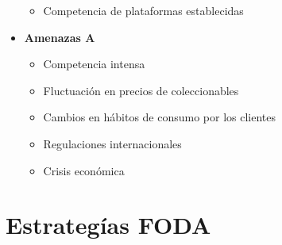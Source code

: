 \documentclass[12pt]{article}
\begin{document}
\begin{itemize}
\begin{itemize}
		\item Competencia de plataformas establecidas

	\end{itemize}

	\item \textbf{Amenazas A}

	\begin{itemize}
		\item Competencia intensa
		
		\item Fluctuación en precios de coleccionables
		
		\item Cambios en hábitos de consumo por los clientes
		
		\item Regulaciones internacionales
		
		\item Crisis económica

	\end{itemize}

\end{itemize}

\section*{Estrategías FODA}
\end{document}
